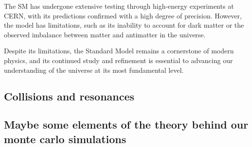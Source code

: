 The SM has undergone extensive testing through high-energy experiments at CERN, with its predictions confirmed with a high degree of precision. However, the model has limitations, such as its inability to account for dark matter or the observed imbalance between matter and antimatter in the universe.

Despite its limitations, the Standard Model remains a cornerstone of modern physics, and its continued study and refinement is essential to advancing our understanding of the universe at its most fundamental level.
\subsection{Collisions and resonances}
\label{sec:org874321a}
\subsection{Maybe some elements of the theory behind our monte carlo simulations}
\label{sec:orgfe09146}
